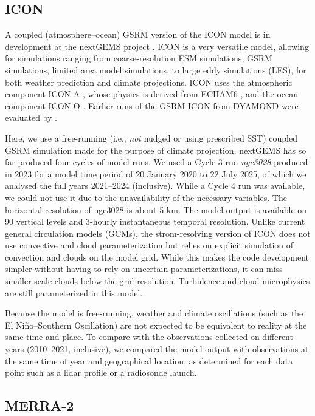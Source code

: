 \documentclass[12pt,a4paper]{article}
\begin{document}
\subsection{ICON}

A coupled (atmosphere--ocean) GSRM version of the ICON model is in development
at the nextGEMS project \citep{hohenegger2023}. ICON is a very versatile model,
allowing for simulations ranging from coarse-resolution ESM simulations, GSRM
simulations, limited area model simulations, to large eddy simulations (LES),
for both weather prediction and climate projections. ICON uses the atmospheric
component ICON-A \citep{giorgetta2018}, whose physics is derived from ECHAM6
\citep{stevens2013}, and the ocean component ICON-O \citep{korn2022}. Earlier
runs of the GSRM ICON from DYAMOND were evaluated by \cite{mauritsen2022}.

Here, we use a free-running (i.e., \emph{not} nudged or using prescribed SST)
coupled GSRM simulation made for the purpose of climate projection.  nextGEMS
has so far produced four cycles of model runs. We used a Cycle 3 run
\emph{ngc3028} produced in 2023 \citep{nextgems2023a,nextgems2023b} for a model
time period of 20 January 2020 to 22 July 2025, of which we analysed the full
years 2021--2024 (inclusive). While a Cycle 4 run was available, we could not
use it due to the unavailability of the necessary variables. The horizontal
resolution of ngc3028 is about 5 km.  The model output is available on 90
vertical levels and 3-hourly instantaneous temporal resolution.  Unlike current
general circulation models (GCMs), the strom-resolving version of ICON does not
use convective and cloud parameterization but relies on explicit simulation of
convection and clouds on the model grid. While this makes the code development
simpler without having to rely on uncertain parameterizations, it can miss
smaller-scale clouds below the grid resolution.  Turbulence and cloud
microphysics are still parameterized in this model.

Because the model is free-running, weather and climate oscillations (such as
the El Niño--Southern Oscillation) are not expected to be equivalent to reality
at the same time and place. To compare with the observations collected on
different years (2010--2021, inclusive), we compared the model output with
observations at the same time of year and geographical location, as determined
for each data point such as a lidar profile or a radiosonde launch.

\subsection{MERRA-2}
\end{document}
